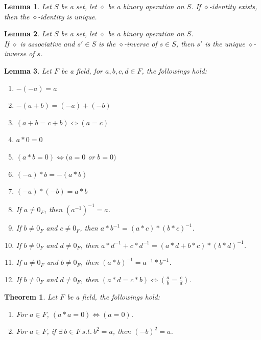 \documentclass[11pt]{article}
\theoremstyle{break}
\theoremstyle{break}
\newtheorem{thm}{Theorem}[section]
\newtheorem{lem}{Lemma}[thm]
\begin{document}
	\begin{lem}
		Let $S$ be a set, let $\diamond$ be a binary operation on $S$. If $\diamond$-identity exists, then the $\diamond$-identity is unique.
	\end{lem}

	\begin{lem}
  		Let $S$ be a set, let $\diamond$ be a binary operation on $S$.\\ If $\diamond$ is associative and $s' \in S$ is the $\diamond$-inverse of $s \in S$,  then $s'$ is the unique $\diamond$-inverse of $s$.
	\end{lem}
	
	\begin{lem}
		Let $F$ be a field, for $a,b,c,d \in F$, the followings hold:
		\begin{enumerate}[topsep=3pt,itemsep=-1ex,partopsep=1ex,parsep=1ex]
			\item $-(-a)=a$
			\item $-(a+b)=(-a)+(-b)$
			\item $(a+b=c+b) \iff (a=c)$
			\item $a \ast 0 =0$
			\item $(a\ast b =0) \iff (a=0$ or $b=0)$
			\item $(-a)\ast b = -(a \ast b)$
			\item $(-a) \ast (-b) = a \ast b$
			\item If $a \neq 0_F$, then $(a^{-1})^{-1}=a$.
			\item If $b \neq 0_F$ and $c\neq 0_F$, then $a \ast b^{-1} = (a \ast c) \ast (b \ast c)^{-1}$.
			\item If $b \neq 0_F$ and $d\neq 0_F$, then $a \ast d^{-1} + c \ast d^{-1} = (a \ast d+b \ast c) \ast (b \ast d)^{-1}$.
			\item If $a \neq 0_F$ and $b\neq 0_F$, then $(a \ast b)^{-1} = a^{-1} \ast b^{-1}$.
			\item If $b \neq 0_F$ and $d\neq 0_F$, then $(a \ast d =c \ast b) \iff (\frac{a}{b} = \frac{c}{d})$.
		\end{enumerate}
	\end{lem}
	
	\begin{thm}
		Let $F$ be a field, the followings hold:
		\begin{enumerate}[topsep=3pt,itemsep=-1ex,partopsep=1ex,parsep=1ex]
			\item For $a \in F$, $(a*a=0) \iff (a=0)$.
			\item For $a \in F$, if $\exists \ b \in F \ s.t. \ b^2=a$, then $(-b)^2 = a$.
		\end{enumerate}
	\end{thm}
	
\end{document}
